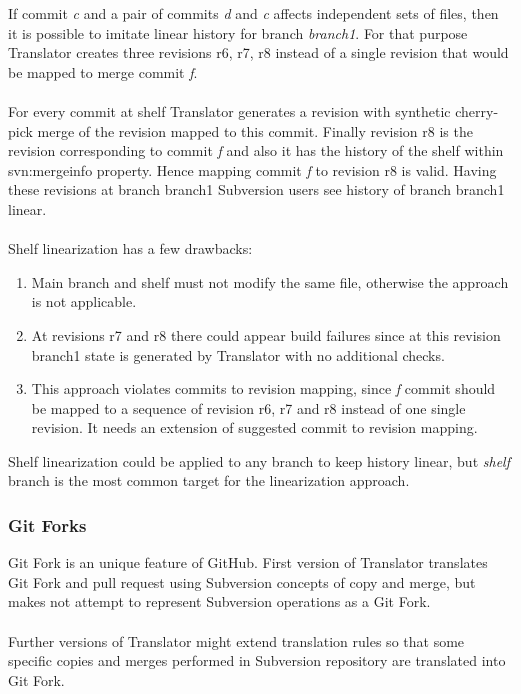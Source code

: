 If commit \emph{c} and a pair of commits \emph{d} and \emph{c} affects independent sets of files, 
then it is possible to imitate linear history for branch \emph{branch1}. 
For that purpose Translator creates three revisions r6, r7, r8 instead of a single revision that would be mapped to merge commit \emph{f}.
\\\\
For every commit at shelf Translator generates a revision with synthetic cherry-pick merge of the revision mapped to this commit. Finally revision r8 is the revision corresponding to commit \emph{f} and also it has the history of the shelf within svn:mergeinfo property. Hence mapping commit \emph{f} to revision r8 is valid. Having these revisions at branch branch1 Subversion users see history of branch branch1 linear.
\\\\
Shelf linearization has a few drawbacks:
\begin{enumerate}
\compactlist
	\item Main branch and shelf must not modify the same file, otherwise the approach is not applicable.
	\item At revisions r7 and r8 there could appear build failures since at this revision branch1 state is generated by Translator with no additional checks.
	\item This approach violates commits to revision mapping, since \emph{f} commit should be mapped to a sequence of revision r6, r7 and r8 instead of one single revision. It needs an extension of suggested commit to revision mapping.
\end{enumerate}

Shelf linearization could be applied to any branch to keep history linear, but \emph{shelf} branch is the most common target
for the linearization approach.

\subsubsection{Git Forks}
Git Fork is an unique feature of GitHub. First version of Translator translates Git Fork and pull request using Subversion concepts of copy and merge,
but makes not attempt to represent Subversion operations as a Git Fork.\\\\
Further versions of Translator might extend translation
rules so that some specific copies and merges performed in Subversion repository are translated into Git Fork.

